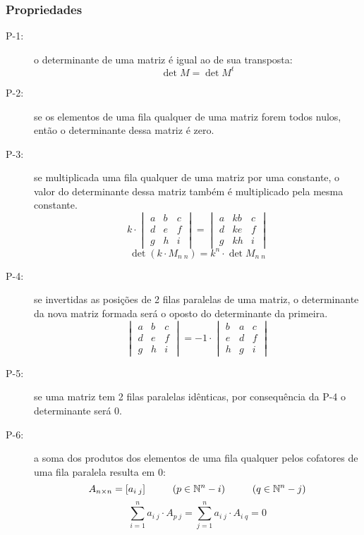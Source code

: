     \subsubsection{Propriedades}
        \begin{description}
            \item[P-1:] o determinante de uma matriz é igual ao de sua transposta:
            \[ \det{M} = \det{M^t} \]
            \item[P-2:] se os elementos de uma fila qualquer de uma matriz forem todos nulos, então o determinante dessa matriz é zero.
            \item[P-3:] se multiplicada uma fila qualquer de uma matriz por uma constante, o valor do determinante dessa matriz também é multiplicado pela mesma constante. \eg
            \[ k \cdot \begin{vmatrix} a & b & c \\ d & e & f \\ g & h & i \end{vmatrix} = \begin{vmatrix} a & kb & c \\ d & ke & f \\ g & kh & i \end{vmatrix} \]
            \[ \det{(k \cdot M_{n \; n})} = k^n \cdot \det{M_{n \; n}} \]
            \item[P-4:] se invertidas as posições de 2 filas paralelas de uma matriz, o determinante da nova matriz formada será o oposto do determinante da primeira. \eg
            \[ \begin{vmatrix} a & b & c \\ d & e & f \\ g & h & i \end{vmatrix} = -1 \cdot \begin{vmatrix} b & a & c \\ e & d & f \\ h & g & i \end{vmatrix} \]
            \item[P-5:] se uma matriz tem 2 filas paralelas idênticas, por consequência da P-4 o determinante será 0.
            \item[P-6:] a soma dos produtos dos elementos de uma fila qualquer pelos cofatores de uma fila paralela resulta em 0:
            \[ A_{n \times n} = [a_{i \; j}] \hphantom{---} (p \in \mathbb{N}^n - i) \hphantom{---} (q \in \mathbb{N}^n - j) \]
            \[ \sum_{i=1}^{n} {a_{i \; j} \cdot A_{p \; j}} = \sum_{j=1}^{n} {a_{i \; j} \cdot A_{i \; q}} = 0 \]

\end{description}

